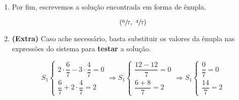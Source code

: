 \begin{enumerate}
    \item Por fim, escrevemos a solução encontrada em forma de ênupla.
    
    $$
    \left(\sfrac{6}{7},~\sfrac{4}{7}\right)
    $$
    
    \item \textbf{(Extra)} Caso ache necessário, basta substituir os valores da ênupla nas expressões do sistema para \textbf{testar} a solução.
    
    $$
    S_1\begin{cases}
    2\cdot \dfrac{6}{7}-3\cdot\dfrac{4}{7}=0 \\[1em]
    \dfrac{6}{7}+2\cdot\dfrac{4}{7}=2
    \end{cases}\Rightarrow 
    S_1\begin{cases}
    \dfrac{12-12}{7}=0\\[1em]
    \dfrac{6+8}{7}=2
    \end{cases}\Rightarrow 
    S_1\begin{cases}
    \dfrac{0}{7}=0\\[1em]
    \dfrac{14}{7}=2
    \end{cases}
    $$

\end{enumerate}